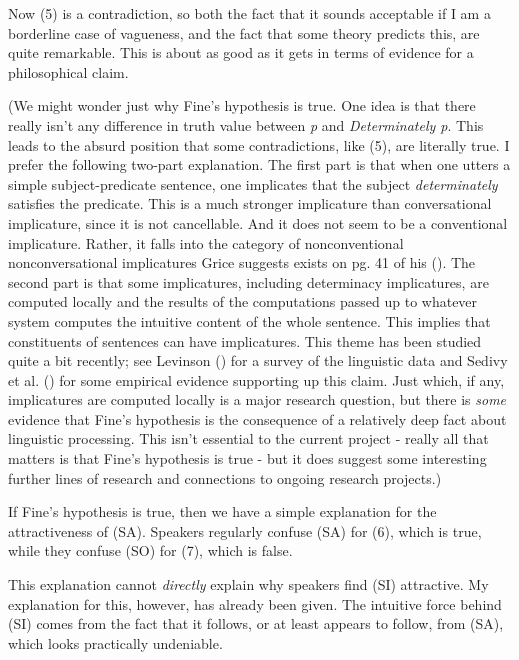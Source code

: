 \documentclass[
  10pt,
  letterpaper,
  DIV=11,
  numbers=noendperiod,
  twoside]{scrartcl}
\begin{document}
Now (5) is a contradiction, so both the fact that it sounds acceptable
if I am a borderline case of vagueness, and the fact that some theory
predicts this, are quite remarkable. This is about as good as it gets in
terms of evidence for a philosophical claim.

(We might wonder just why Fine's hypothesis is true. One idea is that
there really isn't any difference in truth value between \emph{p} and
\emph{Determinately p}. This leads to the absurd position that some
contradictions, like (5), are literally true. I prefer the following
two-part explanation. The first part is that when one utters a simple
subject-predicate sentence, one implicates that the subject
\emph{determinately} satisfies the predicate. This is a much stronger
implicature than conversational implicature, since it is not
cancellable. And it does not seem to be a conventional implicature.
Rather, it falls into the category of nonconventional nonconversational
implicatures Grice suggests exists on pg. 41 of his
(). The second part is that some
implicatures, including determinacy implicatures, are computed locally
and the results of the computations passed up to whatever system
computes the intuitive content of the whole sentence. This implies that
constituents of sentences can have implicatures. This theme has been
studied quite a bit recently; see Levinson
() for a survey of the linguistic data
and Sedivy et al. () for some empirical
evidence supporting up this claim. Just which, if any, implicatures are
computed locally is a major research question, but there is \emph{some}
evidence that Fine's hypothesis is the consequence of a relatively deep
fact about linguistic processing. This isn't essential to the current
project - really all that matters is that Fine's hypothesis is true -
but it does suggest some interesting further lines of research and
connections to ongoing research projects.)

If Fine's hypothesis is true, then we have a simple explanation for the
attractiveness of (SA). Speakers regularly confuse (SA) for (6), which
is true, while they confuse (SO) for (7), which is false.

This explanation cannot \emph{directly} explain why speakers find (SI)
attractive. My explanation for this, however, has already been given.
The intuitive force behind (SI) comes from the fact that it follows, or
at least appears to follow, from (SA), which looks practically
undeniable.
\end{document}
